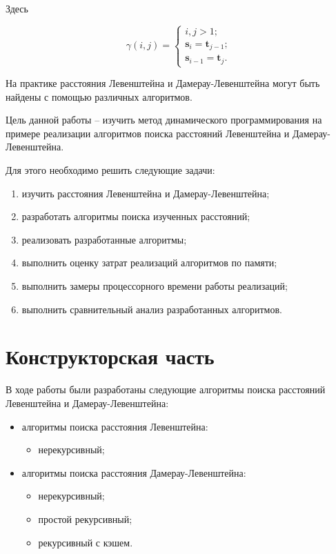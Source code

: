 \documentclass{report}
\begin{document}
Здесь

$$
\gamma(i, j) =
\begin{cases}
    i, j > 1;
    \\
    \textbf{s}_i = \textbf{t}_{j - 1};
    \\
    \textbf{s}_{i - 1} = \textbf{t}_j.
\end{cases}
$$

На практике расстояния Левенштейна и Дамерау-Левенштейна могут
быть найдены с помощью различных алгоритмов.

Цель данной работы -- изучить метод динамического программирования
на примере реализации алгоритмов поиска расстояний Левенштейна и
Дамерау-Левенштейна.

Для этого необходимо решить следующие задачи:

\begin{enumerate}
    \item изучить расстояния Левенштейна и Дамерау-Левенштейна;
    \item разработать алгоритмы поиска изученных расстояний;
    \item реализовать разработанные алгоритмы;
    \item выполнить оценку затрат реализаций алгоритмов по памяти;
    \item выполнить замеры процессорного времени работы реализаций;
    \item выполнить сравнительный анализ разработанных алгоритмов.
\end{enumerate}

\chapter{Конструкторская часть}

В ходе работы были разработаны следующие алгоритмы поиска
расстояний Левенштейна и Дамерау-Левенштейна:

\begin{itemize}
    \item алгоритмы поиска расстояния Левенштейна:
    \begin{itemize}
        \item нерекурсивный;
    \end{itemize}
    \item алгоритмы поиска расстояния Дамерау-Левенштейна:
    \begin{itemize}
        \item нерекурсивный;
        \item простой рекурсивный;
        \item рекурсивный с кэшем.
    \end{itemize}
\end{itemize}
\end{document}
